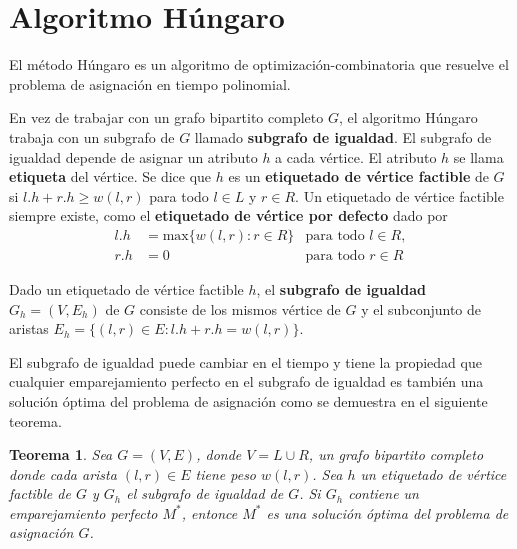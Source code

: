 \documentclass[10pt]{article} %
\newtheorem{thm}{Teorema}
\begin{document}
	\section{Algoritmo H\'ungaro}

El método Húngaro es un algoritmo de optimización-combinatoria que resuelve el problema de asignación en tiempo polinomial.

En vez de trabajar con un grafo bipartito completo $G$, el algoritmo H\'ungaro trabaja con un subgrafo de $G$ llamado \textbf{subgrafo de igualdad}. El subgrafo de igualdad depende de asignar un atributo $h$ a cada v\'ertice. El atributo $h$ se llama \textbf{etiqueta} del v\'ertice. Se dice que $h$ es un \textbf{etiquetado de vértice factible} de $G$ si $l.h + r.h \geq w(l,r)$ para todo $l \in L$ y $r \in R$. Un etiquetado de v\'ertice factible siempre existe, como el \textbf{etiquetado de v\'ertice por defecto} dado por
\begin{align}
	\label{eq:defecto}
	l.h &= \text{max} \{w(l,r):r \in R\} &\text{para todo } l \in R,\\
	r.h &= 0 &\text{para todo } r \in R 
\end{align}

Dado un etiquetado de v\'ertice factible $h$, el \textbf{subgrafo de igualdad} $G_h = (V, E_h)$ de $G$ consiste de los mismos v\'ertice de $G$ y el subconjunto de aristas $E_h = \{(l,r) \in E: l.h + r.h = w(l,r)\}$.

El subgrafo de igualdad puede cambiar en el tiempo y tiene la propiedad que cualquier emparejamiento perfecto en el subgrafo de igualdad es tambi\'en una soluci\'on \'optima del problema de asignaci\'on como se demuestra en el siguiente teorema.
\begin{thm} \cite{introduction}
	\label{thm: emparejamiento}
	Sea $G=(V,E)$, donde $V = L \cup R$, un grafo bipartito completo donde cada arista $(l,r) \in E$ tiene peso $w(l,r)$. Sea $h$ un etiquetado de v\'ertice factible de $G$ y $G_h$ el subgrafo de igualdad de $G$. Si $G_h$ contiene un emparejamiento perfecto $M^*$, entonce $M^*$ es una soluci\'on \'optima del problema de asignaci\'on $G$. 
	
\end{thm}
\end{document}
